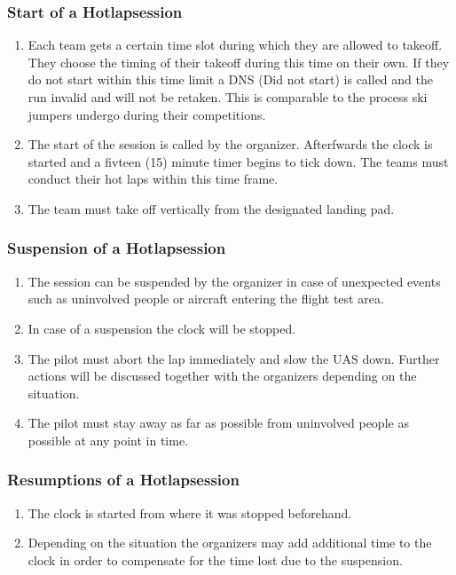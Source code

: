     \subsubsection{Start of a Hotlapsession}
    \begin{enumerate}
      \item Each team gets a certain time slot during which they are allowed to takeoff. They choose the timing of their takeoff during this time on their own. If they do not start within this time limit a DNS (Did not start) is called and the run invalid and will not be retaken. This is comparable to the process ski jumpers undergo during their competitions.
      \item The start of the session is called by the organizer. Afterfwards the clock is started and a fivteen (15) minute timer begins to tick down. The teams must conduct their hot laps within this time frame.
      \item The team must take off vertically from the designated landing pad.  
    \end{enumerate}

    \subsubsection{Suspension of a Hotlapsession}
    \begin{enumerate}
      \item The session can be suspended by the organizer in case of unexpected events such as uninvolved people or aircraft entering the flight test area. 
      \item In case of a suspension the clock will be stopped. 
      \item The pilot must abort the lap immediately and slow the UAS down. Further actions will be discussed together with the organizers depending on the situation.
      \item The pilot must stay away as far as possible from uninvolved people as possible at any point in time. 
    \end{enumerate}

    \subsubsection{Resumptions of a Hotlapsession }
    \begin{enumerate}
      \item The clock is started from where it was stopped beforehand.
      \item Depending on the situation the organizers may add additional time to the clock in order to compensate for the time lost due to the suspension. 
    \end{enumerate}

